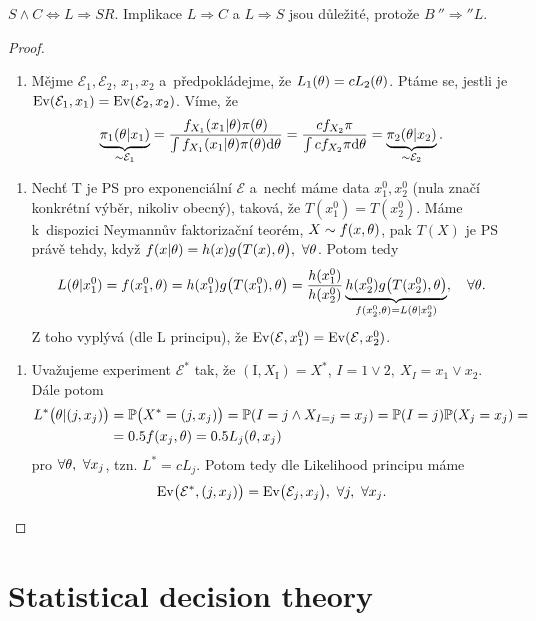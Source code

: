 \begin{theorem}
	$S\wedge C\Leftrightarrow L\Rightarrow SR$. Implikace $L\Rightarrow C$ a $L\Rightarrow S$ jsou důležité, protože $B~''\Rightarrow'' L$.
	\begin{proof}
		\begin{enumerate}[$B"\Rightarrow"L$:]
			\item Mějme $\mathcal{E}_1,\mathcal{E}_2$, $x_1,x_2$ a~předpokládejme, že $L_1(\theta)=c L_2(\theta)$. Ptáme se, jestli je $\mathrm{Ev}(\mathcal{E}_1,x_1)=\mathrm{Ev}(\mathcal{E}_2,x_2)$. Víme, že $$ \underbrace{\pi_1(\theta|x_1)}_{\sim\mathcal{E}_1}=\frac{f_{X_1}(x_1|\theta)\pi(\theta)}{\int f_{X_1}(x_1|\theta)\pi(\theta)\mathrm{d}\theta}=\frac{c f_{X_2}\pi}{\int c f_{X_2}\pi\mathrm{d}\theta}=\underbrace{\pi_2(\theta| x_2)}_{\sim\mathcal{E}_2}.$$
		\end{enumerate}
	\begin{enumerate}[$L\Rightarrow S$:]
		\item Nechť T je PS pro exponenciální $\mathcal{E}$ a~nechť máme data $x_1^0,x_2^0$ (nula značí konkrétní výběr, nikoliv obecný), taková, že $T(x_1^0)=T(x_2^0)$. Máme k~dispozici Neymannův faktorizační teorém, $X\sim f(x,\theta)$, pak $T(X)$ je PS právě tehdy, když $f(x|\theta)=h(x)g\big(T(x),\theta \big),~\forall\theta$. Potom tedy 
		$$ L(\theta|x_1^0)=f(x_1^0,\theta)=h(x_1^0)g\big( T(x_1^0),\theta \big)=\frac{h(x_1^0)}{h(x_2^0)}\underbrace{h(x_2^0)g\big(T(x_2^0),\theta \big)}_{f(x_2^0,\theta)=L(\theta|x_2^0)},\quad\forall\theta.$$
		Z toho vyplývá (dle L principu), že $\mathrm{Ev}(\mathcal{E},x_1^0)=\mathrm{Ev}(\mathcal{E},x_2^0)$.
\end{enumerate}
\begin{enumerate}[$L\Rightarrow C$:]
	\item Uvažujeme experiment $\mathcal{E}^*$ tak, že $(\mathrm{I},X_\mathrm{I})=X^*$, $I=1\vee 2,~X_I=x_1\vee x_2$. 
	Dále potom \[
	\begin{split}
	L^*\big(\theta|(j,x_j)\big)&=\mathbb{P}\big(X^*=(j,x_j) \big)=\mathbb{P}(I=j\wedge X_{I=j}=x_j)=\mathbb{P}(I=j)\mathbb{P}(X_j=x_j)=\\&=0.5f(x_j,\theta)=0.5 L_j(\theta,x_j)
	\end{split}
	\]
	pro $\forall\theta,~\forall x_j$, tzn. $L^*=c L_j$. Potom tedy dle Likelihood principu máme $$\mathrm{Ev}\big(\mathcal{E}^*,(j,x_j) \big)=\mathrm{Ev}\big(\mathcal{E}_j,x_j \big),~\forall j,~\forall x_j.$$
\end{enumerate}
	\end{proof}
\end{theorem}

\section{Statistical decision theory}

